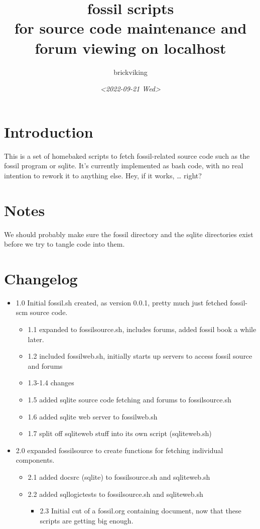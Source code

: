 \documentclass[11pt]{article}
\author{brickviking}
\date{\textit{<2022-09-21 Wed>}}
\title{fossil scripts\\\medskip
\large for source code maintenance and forum viewing on localhost}
\begin{document}
\maketitle


\section*{Introduction}
\label{sec:org3d15dbd}
This is a set of homebaked scripts to fetch fossil-related source code such as the fossil program
or sqlite. It's currently implemented as bash code, with no real intention to rework it to anything
else. Hey, if it works, \ldots{} right?

\section*{Notes}
\label{sec:org7b2d92d}
We should probably make sure the fossil directory and the sqlite directories exist before we
try to tangle code into them.

\section*{Changelog}
\label{sec:org8c0e5af}
\begin{itemize}
\item 1.0 Initial fossil.sh created, as version 0.0.1, pretty much just fetched fossil-scm source
code.
\begin{itemize}
\item 1.1 expanded to fossilsource.sh, includes forums, added fossil book a while later.
\item 1.2 included fossilweb.sh, initially starts up servers to access fossil source and forums
\item 1.3-1.4 changes
\item 1.5 added sqlite source code fetching and forums to fossilsource.sh
\item 1.6 added sqlite web server to fossilweb.sh
\item 1.7 split off sqliteweb stuff into its own script (sqliteweb.sh)
\end{itemize}
\item 2.0 expanded fossilsource to create functions for fetching individual components.
\begin{itemize}
\item 2.1 added docsrc (sqlite) to fossilsource.sh and sqliteweb.sh
\item 2.2 added sqllogictests to fossilsource.sh and sqliteweb.sh

\begin{itemize}
\item 2.3 Initial cut of a fossil.org containing document, now that these scripts are getting big
enough.
\end{itemize}
\end{itemize}
\end{itemize}
\newpage
\end{document}
